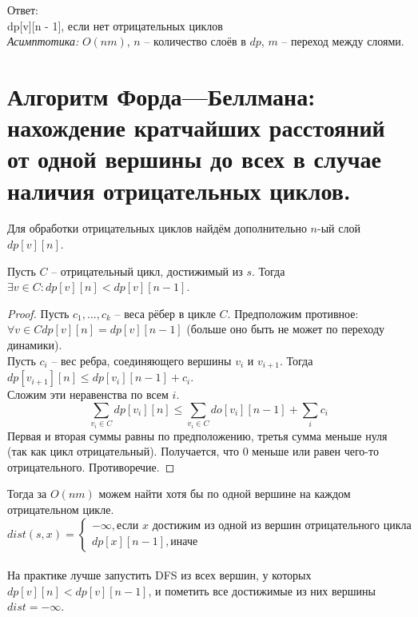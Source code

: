 Ответ:\\
dp[v][n - 1], если нет отрицательных циклов\\

\textit{Асимптотика: } $O(nm)$, $n$ -- количество слоёв в $dp$, $m$ -- переход между слоями.


\setcounter{section}{56}
\section{Алгоритм Форда—Беллмана: нахождение кратчайших расстояний от одной вершины до всех в случае наличия отрицательных циклов.}

Для обработки отрицательных циклов найдём дополнительно $n$-ый слой $dp[v][n]$.

\begin{proposition}
    Пусть $C$ -- отрицательный цикл, достижимый из $s$. Тогда $\exists v \in C: dp[v][n] < dp[v][n - 1]$.
    
    \begin{proof}
        Пусть $c_1, ..., c_k$ -- веса рёбер в цикле $C$. Предположим противное: $\forall v \in C dp[v][n] = dp[v][n - 1]$ (больше оно быть не может по переходу динамики).\\
        Пусть $c_i$ -- вес ребра, соединяющего вершины $v_i$ и $v_{i + 1}$. Тогда $dp[v_{i + 1}][n] \leq dp[v_i][n - 1] + c_i$.\\
        Сложим эти неравенства по всем $i$.\\
        $$
            \sum\limits_{v_i \in C} dp[v_i][n] \leq \sum\limits_{v_i \in C} do[v_i][n - 1] + \sum\limits_{i} c_i
        $$
        Первая и вторая суммы равны по предположению, третья сумма меньше нуля (так как цикл отрицательный). Получается, что 0 меньше или равен чего-то отрицательного. Противоречие.
    \end{proof}
    
\end{proposition}

Тогда за $O(nm)$ можем найти хотя бы по одной вершине на каждом отрицательном цикле.\\

$$
dist(s, x) = 
\begin{cases}
    -\infty, \text{если $x$ достижим из одной из вершин отрицательного цикла}\\
    dp[x][n - 1], \text{иначе}
\end{cases}
$$\\

На практике лучше запустить DFS из всех вершин, у которых $dp[v][n] < dp[v][n - 1]$, и пометить все достижимые из них вершины $dist = -\infty$.